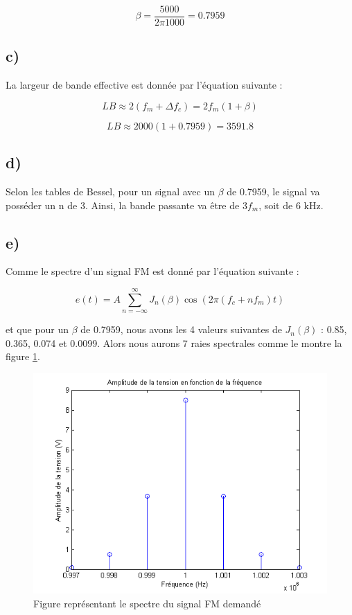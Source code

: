 \begin{equation}
	\beta = \frac{5000}{2\pi 1000} = 0.7959
\end{equation}

\subsection*{c)}
La largeur de bande effective est donnée par l'équation suivante :

\begin{equation}
	LB \approx 2(f_m + \Delta f_c)= 2f_m(1+\beta)
\end{equation}

\begin{equation}
	LB \approx  2000(1+0.7959) = 3591.8
\end{equation}


\subsection*{d)}
Selon les tables de Bessel, pour un signal avec un $\beta$ de 0.7959, le signal va posséder un n de 3. Ainsi, la bande passante va être de $3f_m$, soit de 6 kHz.

\subsection*{e)}

Comme le spectre d'un signal FM est donné par l'équation suivante :

\begin{equation}
	e(t) = A \sum^\infty_{n=-\infty} J_n(\beta)\cos(2\pi(f_c+nf_m)t)
\end{equation}

et que pour un $\beta$ de 0.7959, nous avons les 4 valeurs suivantes de $J_n(\beta)$ : 0.85, 0.365, 0.074 et 0.0099. Alors nous aurons 7 raies spectrales comme le montre la figure \ref{schema1}.

\begin{figure}[htb]
\begin{center}
\includegraphics[scale=0.7]{no1e.png}
\caption{Figure représentant le spectre du signal FM demandé}
\label{schema1}
\end{center}
\end{figure}

